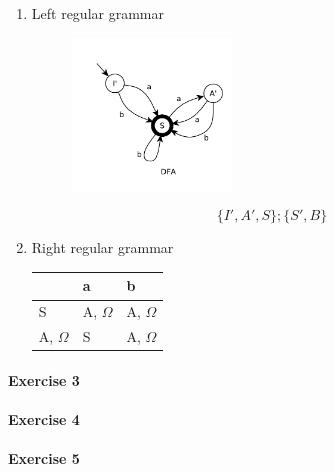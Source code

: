 \begin{enumerate}
    \item
    Left regular grammar
    \begin{figure}[H]
        \centerline{\includegraphics[width=0.4\textwidth]{img/44.pdf}}
    \end{figure}
    $$
        \{I', A', S\}; \{S', B\}
    $$
    \item
    Right regular grammar
    \begin{table}[H]
        \centering
        \begin{tabular}{l|l|l}
            & a & b \\ \hline
            S & A, $\Omega$ & A, $\Omega$ \\ \hline
            A, $\Omega$ & S & A, $\Omega$ \\
        \end{tabular}
    \end{table}
\end{enumerate}

\paragraph{Exercise 3}
\paragraph{Exercise 4}
\paragraph{Exercise 5}
